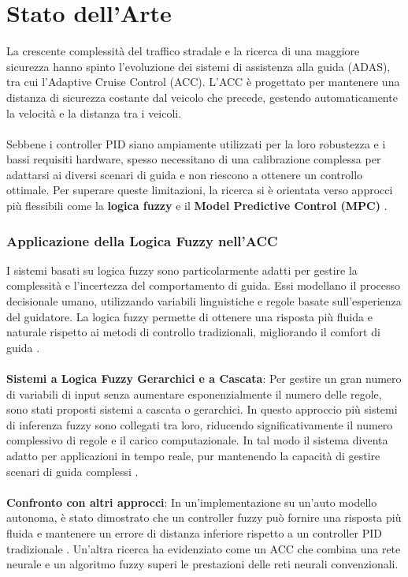 \chapter{Stato dell'Arte}
La crescente complessità del traffico stradale e la ricerca di una maggiore sicurezza hanno spinto l'evoluzione dei sistemi di 
assistenza alla guida (ADAS), tra cui l'Adaptive Cruise Control (ACC). L'ACC è progettato per mantenere una distanza di sicurezza 
costante dal veicolo che precede, gestendo automaticamente la velocità e la distanza tra i veicoli.
\\\\
\noindent Sebbene i controller PID siano ampiamente utilizzati per la loro robustezza e i bassi requisiti hardware, spesso necessitano di 
una calibrazione complessa per adattarsi ai diversi scenari di guida e non riescono a ottenere un controllo ottimale. Per superare 
queste limitazioni, la ricerca si è orientata verso approcci più flessibili come la \textbf{logica fuzzy} 
e il \textbf{Model Predictive Control (MPC)} \cite{singh2015adaptive}.

\subsection*{Applicazione della Logica Fuzzy nell'ACC}
I sistemi basati su logica fuzzy sono particolarmente adatti per gestire la complessità e l'incertezza del 
comportamento di guida. Essi modellano il processo decisionale umano, utilizzando variabili linguistiche e regole 
basate sull'esperienza del guidatore. La logica fuzzy permette di ottenere una risposta più fluida e naturale rispetto 
ai metodi di controllo tradizionali, migliorando il comfort di guida \cite{simic2022cascaded}.
\\\\
\noindent \textbf{Sistemi a Logica Fuzzy Gerarchici e a Cascata}: Per gestire un gran numero di variabili di input 
senza aumentare esponenzialmente il numero delle regole, sono stati proposti sistemi a cascata o gerarchici. 
In questo approccio più sistemi di inferenza fuzzy sono collegati tra loro, riducendo significativamente il numero 
complessivo di regole e il carico computazionale. In tal modo il sistema diventa adatto per applicazioni in tempo reale, 
pur mantenendo la capacità di gestire scenari di guida complessi \cite{simic2022cascaded}.
\\\\
\noindent\textbf{Confronto con altri approcci}: In un'implementazione su un'auto modello autonoma, è stato dimostrato che un controller 
fuzzy può fornire una risposta più fluida e mantenere un errore di distanza inferiore rispetto a un controller PID 
tradizionale \cite{alomari2020fuzzy}. Un'altra ricerca ha evidenziato come un ACC che combina una rete neurale e un algoritmo 
fuzzy superi le prestazioni delle reti neurali convenzionali.

